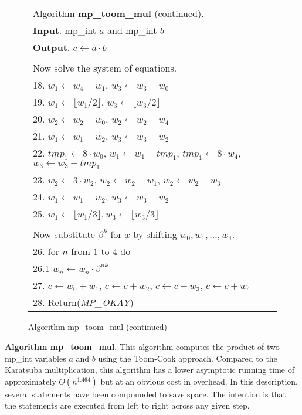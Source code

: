 \documentclass[b5paper]{book}
\begin{document}
\newpage\begin{figure}[!here]
\begin{small}
\begin{center}
\begin{tabular}{l}
\hline Algorithm \textbf{mp\_toom\_mul} (continued). \\
\textbf{Input}.   mp\_int $a$ and mp\_int $b$ \\
\textbf{Output}.  $c \leftarrow a \cdot  b $ \\
\hline \\
Now solve the system of equations. \\
18. $w_1 \leftarrow w_4 - w_1$, $w_3 \leftarrow w_3 - w_0$ \\
19. $w_1 \leftarrow \lfloor w_1 / 2 \rfloor$, $w_3 \leftarrow \lfloor w_3 / 2 \rfloor$ \\
20. $w_2 \leftarrow w_2 - w_0$, $w_2 \leftarrow w_2 - w_4$ \\
21. $w_1 \leftarrow w_1 - w_2$, $w_3 \leftarrow w_3 - w_2$ \\
22. $tmp_1 \leftarrow 8 \cdot w_0$, $w_1 \leftarrow w_1 - tmp_1$, $tmp_1 \leftarrow 8 \cdot w_4$, $w_3 \leftarrow w_3 - tmp_1$ \\
23. $w_2 \leftarrow 3 \cdot w_2$, $w_2 \leftarrow w_2 - w_1$, $w_2 \leftarrow w_2 - w_3$ \\
24. $w_1 \leftarrow w_1 - w_2$, $w_3 \leftarrow w_3 - w_2$ \\
25. $w_1 \leftarrow \lfloor w_1 / 3 \rfloor, w_3 \leftarrow \lfloor w_3 / 3 \rfloor$ \\
\\
Now substitute $\beta^k$ for $x$ by shifting $w_0, w_1, ..., w_4$. \\
26. for $n$ from $1$ to $4$ do \\
\hspace{3mm}26.1  $w_n \leftarrow w_n \cdot \beta^{nk}$ \\
27. $c \leftarrow w_0 + w_1$, $c \leftarrow c + w_2$, $c \leftarrow c + w_3$, $c \leftarrow c + w_4$ \\
28. Return(\textit{MP\_OKAY}) \\
\hline
\end{tabular}
\end{center}
\end{small}
\caption{Algorithm mp\_toom\_mul (continued)}
\end{figure}

\textbf{Algorithm mp\_toom\_mul.}
This algorithm computes the product of two mp\_int variables $a$ and $b$ using the Toom-Cook approach.  Compared to the Karatsuba multiplication, this 
algorithm has a lower asymptotic running time of approximately $O(n^{1.464})$ but at an obvious cost in overhead.  In this
description, several statements have been compounded to save space.  The intention is that the statements are executed from left to right across
any given step.
\end{document}

